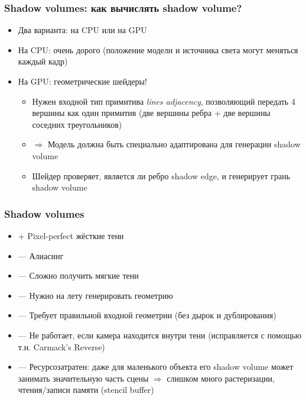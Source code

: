 \documentclass[10pt]{beamer}
\begin{document}
\begin{frame}[fragile]
\frametitle{Shadow volumes: как вычислять shadow volume?}
\begin{itemize}
\item Два варианта: на CPU или на GPU
\pause
\item На CPU: очень дорого (положение модели и источника света могут меняться каждый кадр)
\pause
\item На GPU: геометрические шейдеры!
\begin{itemize}
\item Нужен входной тип примитива \textit{lines adjacency}, позволяющий передать 4 вершины как один примитив (две вершины ребра + две вершины соседних треугольников)
\pause
\item \begin{math}\Longrightarrow\end{math} Модель должна быть специально адаптирована для генерации shadow volume
\pause
\item Шейдер проверяет, является ли ребро shadow edge, и генерирует грань shadow volume
\end{itemize}
\end{itemize}
\end{frame}

\begin{frame}[fragile]
\frametitle{Shadow volumes}
\begin{itemize}
\item {\color{green}+} Pixel-perfect жёсткие тени
\item {\color{red}---} Алиасинг
\item {\color{red}---} Сложно получить мягкие тени
\item {\color{red}---} Нужно на лету генерировать геометрию
\item {\color{red}---} Требует правильной входной геометрии (без дырок и дублирования)
\item {\color{red}---} Не работает, если камера находится внутри тени (исправляется с помощью т.н. Carmack's Reverse)
\item {\color{red}---} Ресурсозатратен: даже для маленького объекта его shadow volume может занимать значительную часть сцены \begin{math}\Longrightarrow\end{math} слишком много растеризации, чтения/записи памяти (stencil buffer)
\end{itemize}
\end{frame}
\end{document}
